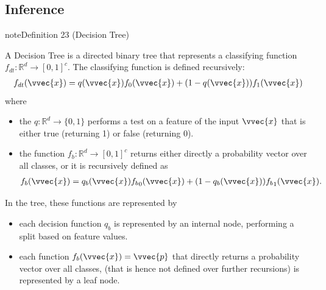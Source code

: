 \documentclass[letterpaper,10pt,english]{jupyterBook}
\begin{document}
\subsection{Inference}
\label{\detokenize{classification_decision_trees:inference}}\label{classification_decision_trees:definition-0}
\begin{sphinxadmonition}{note}{Definition 23 (Decision Tree)}



\sphinxAtStartPar
A Decision Tree is a directed binary tree that represents a classifying function \(f_{dt}:\mathbb{R}^d\rightarrow [0,1]^c\). The classifying function is defined recursively:
\begin{equation*}
\begin{split}f_{dt}(\vvec{x})=q(\vvec{x})f_0(\vvec{x}) + (1-q(\vvec{x}))f_1(\vvec{x})\end{split}
\end{equation*}
where
\begin{itemize}
\item {} 
\sphinxAtStartPar
the  \(q:\mathbb{R}^d\rightarrow \{0,1\}\) performs a test on a feature of the input \(\vvec{x}\) that is either true (returning 1) or false (returning 0).

\item {} 
\sphinxAtStartPar
the function \(f_b:\mathbb{R}^d\rightarrow [0,1]^c\) returns either directly a probability vector over all classes, or it is recursively defined as
\begin{equation*}
\begin{split}f_b(\vvec{x}) = q_b(\vvec{x}){f_b}_0(\vvec{x}) + (1-q_b(\vvec{x})){f_b}_1(\vvec{x}).\end{split}
\end{equation*}

\end{itemize}

\sphinxAtStartPar
In the tree, these functions are represented by
\begin{itemize}
\item {} 
\sphinxAtStartPar
{} each decision function \(q_b\) is represented by an internal node, performing a split based on feature values.

\item {} 
\sphinxAtStartPar
{} each function \(f_b(\vvec{x})=\vvec{p}\) that directly returns a probability vector over all classes, (that is hence not defined over further recursions) is represented by a leaf node.

\end{itemize}
\end{sphinxadmonition}
\end{document}
